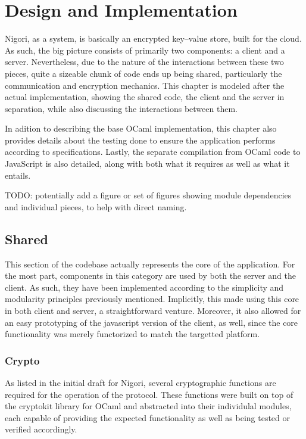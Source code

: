 \chapter{Design and Implementation}
Nigori, as a system, is basically an encrypted key--value store, built for the cloud.
As such, the big picture consists of primarily two components: a client and a server.
Nevertheless, due to the nature of the interactions between these two pieces, quite a sizeable chunk of code ends up being shared, particularly the communication and encryption mechanics.
This chapter is modeled after the actual implementation, showing the shared code, the client and the server in separation, while also discussing the interactions between them.

In adition to describing the base OCaml implementation, this chapter also provides details about the testing done to ensure the application performs according to specifications.
Lastly, the separate compilation from OCaml code to JavaScript is also detailed, along with both what it requires as well as what it entails.

TODO: potentially add a figure or set of figures showing module dependencies and individual pieces, to help with direct naming.

\section{Shared}
This section of the codebase actually represents the core of the application.
For the most part, components in this category are used by both the server and the client.
As such, they have been implemented according to the simplicity and modularity principles previously mentioned.
Implicitly, this made using this core in both client and server, a straightforward venture.
Moreover, it also allowed for an easy prototyping of the javascript version of the client, as well, since the core functionality was merely functorized to match the targetted platform.

\subsection{Crypto}
As listed in the initial draft for Nigori, several cryptographic functions are required for the operation of the protocol.
These functions were built on top of the cryptokit library for OCaml and abstracted into their individulal modules, each capable of providing the expected functionality as well as being tested or verified accordingly.

